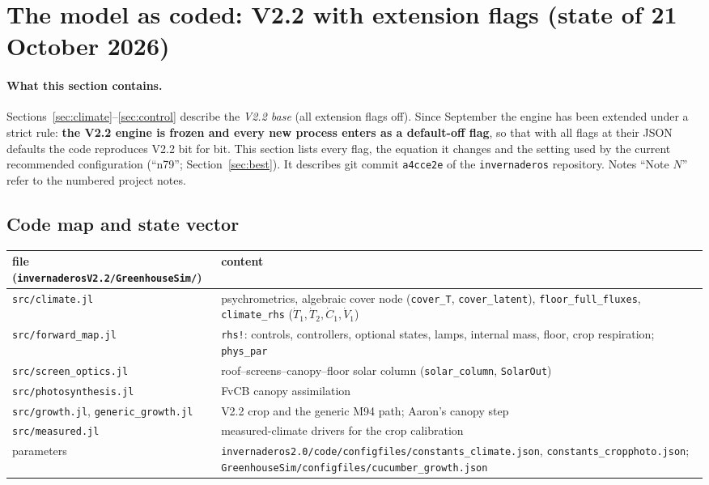 \documentclass[11pt,a4paper]{article}
\begin{document}
\section{The model as coded: V2.2 with extension flags (state of 21 October 2026)}\label{sec:flags}
\sloppy

\paragraph{What this section contains.} Sections~\ref{sec:climate}--\ref{sec:control} describe the
\emph{V2.2 base} (all extension flags off). Since September the engine has been extended under a strict
rule: \textbf{the V2.2 engine is frozen and every new process enters as a default-off flag}, so that with
all flags at their JSON defaults the code reproduces V2.2 bit for bit. This section lists every flag, the
equation it changes and the setting used by the current recommended configuration
(``n79''; Section~\ref{sec:best}). It describes git commit \texttt{a4cce2e} of the
\texttt{invernaderos} repository. Notes ``Note $N$'' refer to the numbered project notes.

\subsection{Code map and state vector}
\begin{center}\small
\begin{tabular}{>{\raggedright\arraybackslash}p{}>{\raggedright\arraybackslash}p{}}
\toprule
file (\texttt{invernaderosV2.2/GreenhouseSim/}) & content\\
\midrule
\texttt{src/climate.jl} & psychrometrics, algebraic cover node (\texttt{cover\_T}, \texttt{cover\_latent}),
\texttt{floor\_full\_fluxes}, \texttt{climate\_rhs} ($\dot T_1,\dot T_2,\dot C_1,\dot V_1$)\\
\texttt{src/forward\_map.jl} & \texttt{rhs!}: controls, controllers, optional states, lamps, internal mass,
floor, crop respiration; \texttt{phys\_par}\\
\texttt{src/screen\_optics.jl} & roof--screens--canopy--floor solar column (\texttt{solar\_column}, \texttt{SolarOut})\\
\texttt{src/photosynthesis.jl} & FvCB canopy assimilation\\
\texttt{src/growth.jl}, \texttt{generic\_growth.jl} & V2.2 crop and the generic M94 path; Aaron's canopy step\\
\texttt{src/measured.jl} & measured-climate drivers for the crop calibration\\
parameters & \texttt{invernaderos2.0/code/configfiles/constants\_climate.json}, \texttt{constants\_cropphoto.json};
\texttt{GreenhouseSim/configfiles/cucumber\_growth.json}\\
\bottomrule
\end{tabular}
\end{center}
\end{document}
